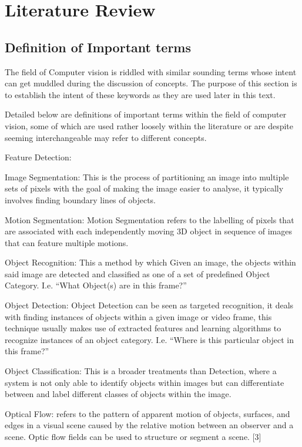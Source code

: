 \chapter{Literature Review}

\section{Definition of Important terms}
The field of Computer vision is riddled with similar sounding terms whose intent
can get muddled during the discussion of concepts.  The purpose of this section
is to establish the intent of these keywords as they are used later in this text.

Detailed below are definitions of important terms within the field of computer
vision, some of which are used rather loosely within the literature or are
despite seeming interchangeable may refer to different concepts. 

Feature Detection:

Image Segmentation: This is the process of partitioning an image into multiple
sets of pixels with the goal of making the image easier to analyse, it typically
involves finding boundary lines of objects. 

Motion Segmentation: Motion Segmentation refers to the labelling of pixels that
are associated with each independently moving 3D object in sequence of images
that can feature multiple motions. \cite{Tekalp2014}

Object Recognition: This a method by which Given an image, the objects within
said image are detected and classified as one of a set of predefined Object
Category.  I.e. “What Object(s) are in this frame?”

Object Detection: Object Detection can be seen as targeted recognition, it deals
with finding instances of objects within a given image or video frame, this
technique usually makes use of extracted features and learning algorithms to
recognize instances of an object category.  I.e. “Where is this particular
object in this frame?”

Object Classification: This is a broader treatments than Detection, where a
system is not only able to identify objects within images but can differentiate
between and label different classes of objects within the image. 

Optical Flow: refers to the pattern of apparent motion of objects, surfaces, and
edges in a visual scene caused by the relative motion between an observer and a
scene. Optic flow fields can be used to structure or segment a scene. [3]

